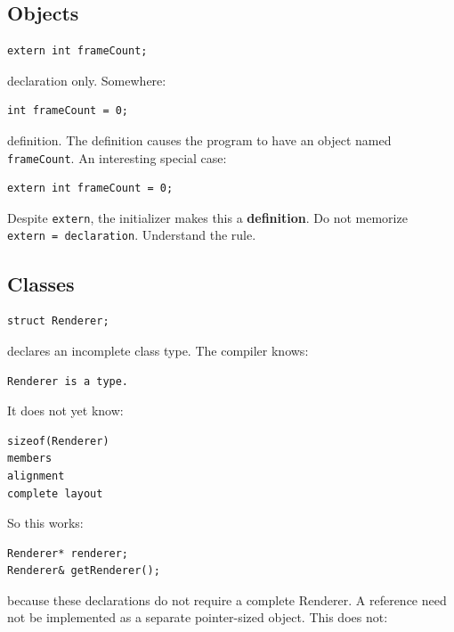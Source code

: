 \subsection{Objects}\label{05-engine-i-ch002-objects}

\begin{verbatim}
extern int frameCount;
\end{verbatim}

declaration only. Somewhere:

\begin{verbatim}
int frameCount = 0;
\end{verbatim}

definition. The definition causes the program to have an object named \texttt{frameCount}. An interesting special case:

\begin{verbatim}
extern int frameCount = 0;
\end{verbatim}

Despite \texttt{extern}, the initializer makes this a \textbf{definition}. Do not memorize \texttt{extern\ =\ declaration}. Understand the rule.

\subsection{Classes}\label{05-engine-i-ch002-classes}

\begin{verbatim}
struct Renderer;
\end{verbatim}

declares an incomplete class type. The compiler knows:

\begin{verbatim}
Renderer is a type.
\end{verbatim}

It does not yet know:

\begin{verbatim}
sizeof(Renderer)
members
alignment
complete layout
\end{verbatim}

So this works:

\begin{verbatim}
Renderer* renderer;
Renderer& getRenderer();
\end{verbatim}

because these declarations do not require a complete Renderer. A reference need not be implemented as a separate pointer-sized object. This does not:

